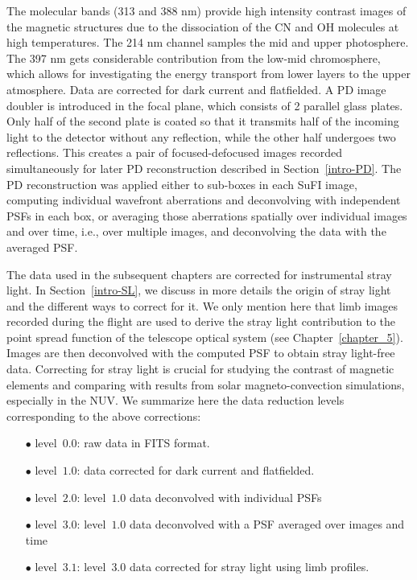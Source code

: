 \documentclass[goettingen, gauss, print]{thesis}
\begin{document}
The molecular bands (313 and 388 nm) provide high intensity contrast images of the magnetic structures due to the dissociation of the CN and OH molecules at high temperatures. The 214 nm channel samples the mid and upper photosphere. The 397 nm gets considerable contribution from the low-mid chromosphere, which allows for investigating the energy transport from lower layers to the upper atmosphere. 
Data are corrected for dark current and flatfielded. A PD image doubler is introduced in the focal plane, which consists of 2 parallel glass plates. Only half of the second plate is coated so that it transmits half of the incoming light to the detector without any reflection, while the other half undergoes two reflections. This creates a pair of focused-defocused images recorded simultaneously for later PD reconstruction described in Section~\ref{intro-PD}. The PD reconstruction was applied either to sub-boxes in each SuFI image, computing individual wavefront aberrations and deconvolving with independent PSFs in each box, or averaging those aberrations spatially over individual images and over time, i.e., over multiple images, and deconvolving the data with the averaged PSF.

The data used in the subsequent chapters are corrected for instrumental stray light. In Section~\ref{intro-SL}, we discuss in more details the origin of stray light and the different ways to correct for it. We only mention here that limb images recorded during the flight are used to derive the stray light contribution to the point spread function of the telescope optical system (see Chapter~\ref{chapter_5}). Images are then deconvolved with the computed PSF to obtain stray light-free data. Correcting for stray light is crucial for studying the contrast of magnetic elements and comparing with results from solar magneto-convection simulations, especially in the NUV. We summarize here the data reduction levels corresponding to the above corrections:
\begin{enumerate}
\item[$\bullet$] level~$0.0$: raw data in FITS format.
\item[$\bullet$] level~$1.0$: data corrected for dark current and flatfielded.
\item[$\bullet$] level~$2.0$: level~$1.0$ data deconvolved with individual PSFs 
\item[$\bullet$] level~$3.0$: level~$1.0$ data deconvolved with a PSF averaged over images and time
\item[$\bullet$] level~$3.1$: level~$3.0$ data corrected for stray light using limb profiles.
\end{enumerate}
\end{document}
